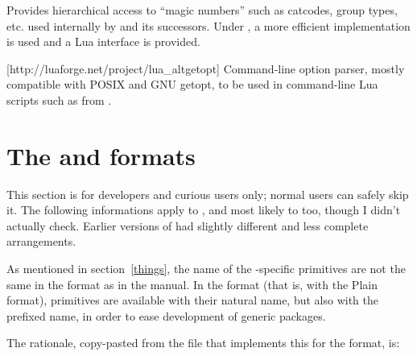 \documentclass{lltxdoc}
\begin{document}
Provides hierarchical access to ``magic numbers'' such as catcodes, group
types, etc. used internally by \tex and its successors. Under \luatex, a more
efficient implementation is used and a Lua interface is provided.

[http://luaforge.net/project/lua_altgetopt]
Command-line option parser, mostly compatible with POSIX and GNU getopt, to be
used in command-line Lua scripts such as  from
.


\section{The  and  formats}\label{formats}

This section is for developers and curious users only; normal users can safely
skip it. The following informations apply to , and most likely to
 too, though I didn't actually check. Earlier versions of \texlive
had slightly different and less complete arrangements.

As mentioned in section~\ref{things}, the name of the \luatex-specific
primitives are not the same in the  format as in the \luatex
manual. In the  format (that is, \luatex with the Plain format),
primitives are available with their natural name, but also with the prefixed
name, in order to ease development of generic packages.

The rationale, copy-pasted from the file  that
implements this for the  format, is:
\end{document}

